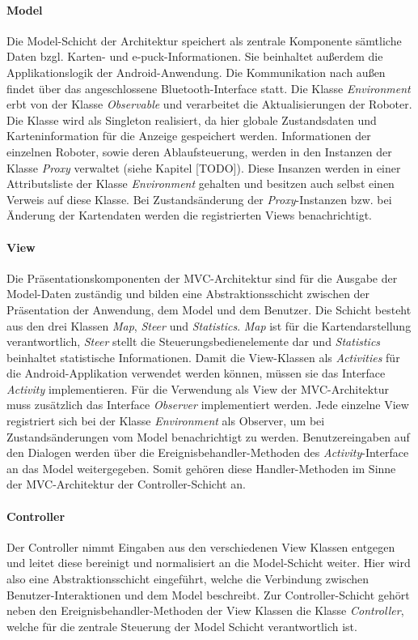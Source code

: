 \documentclass[10pt,a4paper]{article}
\begin{document}
			\paragraph*{Model}
  				Die Model-Schicht der Architektur speichert als zentrale Komponente sämtliche Daten bzgl. Karten- und e-puck-Informationen. 
  				Sie beinhaltet außerdem die Applikationslogik der Android-Anwendung. Die Kommunikation nach außen findet über das
  				angeschlossene Bluetooth-Interface statt. Die Klasse \textit{Environment} erbt von der Klasse \textit{Observable} und verarbeitet
  				die Aktualisierungen der Roboter. Die Klasse wird als Singleton realisiert, da hier globale Zustandsdaten und Karteninformation
  				für die Anzeige gespeichert werden. Informationen der einzelnen Roboter, sowie deren Ablaufsteuerung, werden in den Instanzen
  				der Klasse \textit{Proxy} verwaltet (siehe Kapitel [TODO]). Diese Insanzen werden in einer Attributsliste der Klasse \textit{Environment}
  				gehalten und besitzen auch selbst einen Verweis auf diese Klasse. Bei	Zustandsänderung der \textit{Proxy}-Instanzen bzw. bei
  				Änderung der Kartendaten werden die registrierten Views benachrichtigt.
  			\paragraph*{View}
  				Die Präsentationskomponenten der MVC-Architektur sind für die Ausgabe der Model-Daten zuständig und bilden eine
  				Abstraktionsschicht zwischen der Präsentation der Anwendung, dem Model und dem Benutzer. Die Schicht besteht aus den drei
  				Klassen	\textit{Map}, \textit{Steer} und \textit{Statistics}. \textit{Map} ist für die Kartendarstellung
  				verantwortlich, \textit{Steer} stellt die Steuerungsbedienelemente dar und \textit{Statistics} beinhaltet statistische
  				Informationen.  Damit die View-Klassen als \textit{Activities} für die Android-Applikation verwendet werden können, müssen sie
  				das Interface \textit{Activity} implementieren. Für die Verwendung als View der MVC-Architektur muss zusätzlich das Interface
  				\textit{Observer} implementiert werden. Jede einzelne View registriert sich bei der Klasse \textit{Environment} als Observer,
  				um bei Zustandsänderungen vom Model benachrichtigt zu werden. Benutzereingaben auf den Dialogen werden über
  				die Ereignisbehandler-Methoden des \textit{Activity}-Interface an das Model weitergegeben. Somit gehören diese Handler-Methoden
  				im Sinne der MVC-Architektur der Controller-Schicht an.
  			\paragraph*{Controller}
  				Der Controller nimmt Eingaben aus den verschiedenen View Klassen entgegen und leitet diese bereinigt und normalisiert an die
  				Model-Schicht weiter. Hier wird also eine Abstraktionsschicht eingeführt, welche die Verbindung zwischen Benutzer-Interaktionen
  				und dem Model beschreibt. Zur Controller-Schicht gehört neben den Ereignisbehandler-Methoden der View Klassen die Klasse
  				\textit{Controller}, welche für die zentrale Steuerung der Model Schicht verantwortlich ist.
\end{document}
